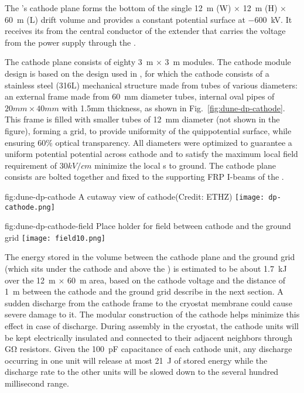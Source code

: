 The \dpmod{}'s cathode plane forms the  bottom of the single  \SI{12}{\m} (W) $\times$ \SI{12}{\m} (H) $\times$ \SI{60}{\m} (L) drift volume and provides a constant potential surface at \SI{-600}{\kV}.  It receives its \hv from the central conductor of the extender that carries the voltage from the power supply through the \hv \fdth.  

The cathode plane consists of eighty \SI{3}{\m} $\times$ \SI{3}{\m} modules. 
The cathode module design is based on the design used in  , for which the cathode consists of a stainless steel (316L) mechanical structure made from
tubes of various diameters: an external frame made from \SI{60}{\milli\m} diameter tubes, internal oval pipes of $20mm\times 40mm$ with 1.5mm thickness, as shown in Fig.~\ref{fig:dune-dp-cathode}. 
This frame is filled with smaller tubes of \SI{12}{\milli\m} diameter (not shown in the figure), forming a grid, to provide uniformity of the quippotential surface, while ensuring 60\% optical transparency. All diameters were optimized to guarantee a uniform potential  potential across cathode and to satisfy the maximum local field requirement of $30kV/cm$ minimize the local \efield{}s to ground.
The cathode plane consists are bolted together and fixed to the supporting FRP I-beams of the \fc. 


\begin{dunefigure}{fig:dune-dp-cathode}
{A cutaway view of  cathode(Credit: ETHZ)}
\texttt{[image: dp-cathode.png]}
\end{dunefigure}

\begin{dunefigure}{fig:dune-dp-cathode-field}
{Place holder for field between cathode and the ground grid} 
\texttt{[image: field10.png]}
\end{dunefigure}

The energy stored in the volume between the cathode plane and the ground grid (which sits under the cathode and above the ) is estimated to be about \SI{1.7}{\kilo\joule} over the \SI{12}{\m} $\times$ \SI{60}{\m} area, based on the cathode voltage and the distance of \SI{1}{\m} between the cathode and the ground grid describe in the next section. 
A sudden discharge from the cathode frame to the cryostat membrane could cause severe damage to it.  The modular construction of the cathode helps minimize this effect in case of discharge. During assembly in the cryostat, the cathode units will be kept electrically insulated and connected to their adjacent neighbors through \si{\giga\ohm}  
resistors. Given the \SI{100}{\pico\farad} capacitance of each cathode unit, any discharge occurring in one unit will release at most 
\SI{21}{\joule} of stored energy while the discharge rate  
to the other units will be slowed down to the several hundred millisecond range.

